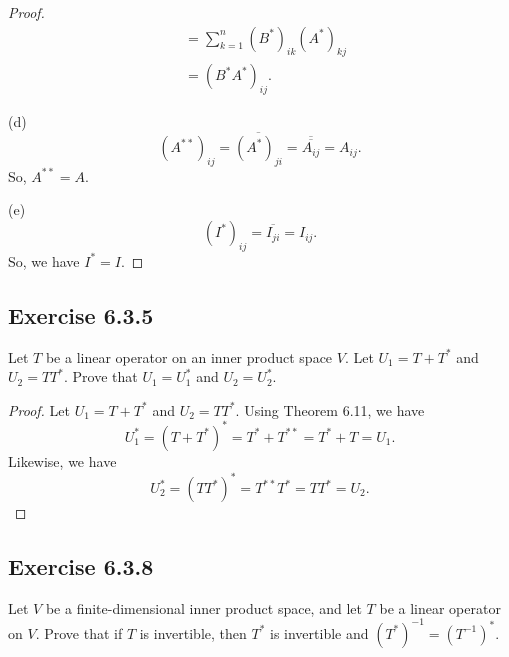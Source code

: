 \begin{enumerate}
\begin{proof}
\begin{align*}
                                                                   &=\sum_{ k=1  }^{ n } {(B^{*})}_{ik} {(A^{*})}_{kj} \\
                                                                   &= (B^{*} A^{*})_{ij}.
            \end{align*}
        \item[(d)] 
            \[  {(A^{**})}_{ij} = \overline{{(A^{*})}_{ji}} = \overline{\overline{{A}_{ij}}}  = {A}_{ij}.\]
            So, \( A^{* *} = A  \).
        \item[(e)] 
            \[  {(I^{*})}_{ij} = \overline{{I}_{ji}} = {I}_{ij}. \]
            So, we have \( I^{*} = I  \).
        \end{proof}
\end{enumerate}

\subsection*{Exercise 6.3.5} Let \( T  \) be a linear operator on an inner product space \( V  \). Let \( {U}_{1} = T + T^{*} \) and \( {U}_{2} = TT^{*} \). Prove that \( {U}_{1} = {U}_{1}^{*} \) and \( {U}_{2} = {U}_{2}^{*} \).
\begin{proof}
Let \( {U}_{1} = T + T^{*} \) and \( {U}_{2} = T T^{*} \). Using Theorem 6.11, we have
\[ {U}_{1}^{*} = (T + T^{*})^{*} = T^{*} + T^{* *} = T^{*} + T = {U}_{1}. \]
Likewise, we have
\[  {U}_{2}^{*} = (T T^{*})^{*} = T^{* * } T^{*} = T T^{*} = {U}_{2}. \]
\end{proof}

\subsection*{Exercise 6.3.8} Let \( V \) be a finite-dimensional inner product space, and let \( T  \) be a linear operator on \( V  \). Prove that if \( T  \) is invertible, then \( T^{*}  \) is invertible and \( (T^{*})^{-1} = (T^{-1})^{*} \).

